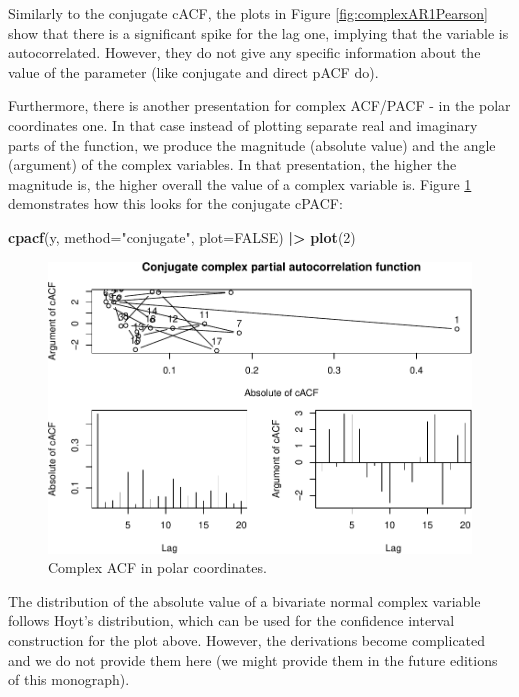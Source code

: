 \documentclass[
]{book}
\newenvironment{Shaded}{\begin{snugshade}}{\end{snugshade}}
\newcommand{\DataTypeTok}[1]{\textcolor[rgb]{0.13,0.29,0.53}{#1}}
\newcommand{\DecValTok}[1]{\textcolor[rgb]{0.00,0.00,0.81}{#1}}
\newcommand{\ErrorTok}[1]{\textcolor[rgb]{0.64,0.00,0.00}{\textbf{#1}}}
\newcommand{\KeywordTok}[1]{\textcolor[rgb]{0.13,0.29,0.53}{\textbf{#1}}}
\newcommand{\NormalTok}[1]{#1}
\newcommand{\OperatorTok}[1]{\textcolor[rgb]{0.81,0.36,0.00}{\textbf{#1}}}
\newcommand{\OtherTok}[1]{\textcolor[rgb]{0.56,0.35,0.01}{#1}}
\newcommand{\StringTok}[1]{\textcolor[rgb]{0.31,0.60,0.02}{#1}}
\begin{document}
Similarly to the conjugate cACF, the plots in Figure \ref{fig:complexAR1Pearson} show that there is a significant spike for the lag one, implying that the variable is autocorrelated. However, they do not give any specific information about the value of the parameter (like conjugate and direct pACF do).

Furthermore, there is another presentation for complex ACF/PACF - in the polar coordinates one. In that case instead of plotting separate real and imaginary parts of the function, we produce the magnitude (absolute value) and the angle (argument) of the complex variables. In that presentation, the higher the magnitude is, the higher overall the value of a complex variable is. Figure \ref{fig:complexAR1Ploar} demonstrates how this looks for the conjugate cPACF:

\begin{Shaded}
\begin{Highlighting}[]
\KeywordTok{cpacf}\NormalTok{(y, }\DataTypeTok{method=}\StringTok{"conjugate"}\NormalTok{, }\DataTypeTok{plot=}\OtherTok{FALSE}\NormalTok{) }\OperatorTok{|}\ErrorTok{\textgreater{}}
\StringTok{    }\KeywordTok{plot}\NormalTok{(}\DecValTok{2}\NormalTok{)}
\end{Highlighting}
\end{Shaded}

\begin{figure}
\centering
\includegraphics{Svetunkov---Svetunkov---Complex-Valued-Econometrics_files/figure-latex/complexAR1Ploar-1.pdf}
\caption{\label{fig:complexAR1Ploar}Complex ACF in polar coordinates.}
\end{figure}

The distribution of the absolute value of a bivariate normal complex variable follows Hoyt's distribution, which can be used for the confidence interval construction for the plot above. However, the derivations become complicated and we do not provide them here (we might provide them in the future editions of this monograph).
\end{document}
